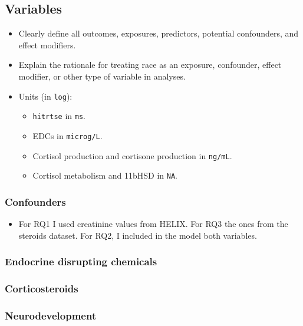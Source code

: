 \documentclass[
  letterpaper,
  DIV=11,
  numbers=noendperiod]{scrartcl}
\providecommand{\tightlist}{%
  \setlength{\itemsep}{0pt}\setlength{\parskip}{0pt}}\usepackage{longtable,booktabs,array}
\begin{document}
\subsection{Variables}\label{sec-vars}

\begin{itemize}
\item
  Clearly define all outcomes, exposures, predictors, potential
  confounders, and effect modifiers.
\item
  Explain the rationale for treating race as an exposure, confounder,
  effect modifier, or other type of variable in analyses.
\item
  Units (in \texttt{log}):

  \begin{itemize}
  \tightlist
  \item
    \texttt{hitrtse} in \texttt{ms}.
  \item
    EDCs in \texttt{microg/L}.
  \item
    Cortisol production and cortisone production in \texttt{ng/mL}.
  \item
    Cortisol metabolism and 11bHSD in \texttt{NA}.
  \end{itemize}
\end{itemize}

\subsubsection{Confounders}\label{sec-confounders}

\begin{itemize}
\tightlist
\item
  For RQ1 I used creatinine values from HELIX. For RQ3 the ones from the
  steroids dataset. For RQ2, I included in the model both variables.
\end{itemize}

\subsubsection{Endocrine disrupting chemicals}\label{sec-edcs}

\subsubsection{Corticosteroids}\label{sec-steroids}

\subsubsection{Neurodevelopment}\label{sec-neurodevelopment}
\end{document}
